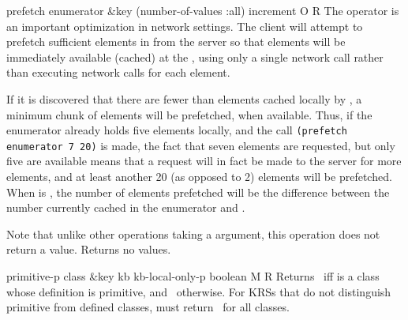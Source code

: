 \begin{okbcop}{prefetch}{ enumerator \&key (number-of-values :all) increment} { \void } { O } { R } {  }
The  operator is an important optimization in network
   settings.  The client will attempt to prefetch sufficient elements in
    from the server so that  elements
   will be immediately available (cached) at the , using
   only a single network call rather than executing network calls for each 
   element.

   If it is discovered that there are fewer than 
   elements cached locally by , a minimum chunk of
    elements will be prefetched, when available.  Thus, if
   the enumerator already holds five elements locally, and the call
   \verb|(prefetch enumerator 7 20)|
   is made, the fact that seven elements are requested, but only five are 
   available means that a request will in fact be made to the server for more
   elements, and at least another 20 (as opposed to 2) elements will be 
   prefetched.  When  is \false, the number of elements 
   prefetched will be the difference between the number currently cached in 
   the enumerator and .

   Note that unlike other operations taking a  
   argument, this operation does not return a  value.  
   Returns no values.
\end{okbcop}

\begin{okbcop}{primitive-p}{ class \&key kb kb-local-only-p} { boolean } { M } { R } {  }
Returns \true\ iff  is a class whose definition is
   primitive, and \false\ otherwise.  For KRSs that do not distinguish
   primitive from defined classes, 
   must return \true\ for all classes.
\end{okbcop}

